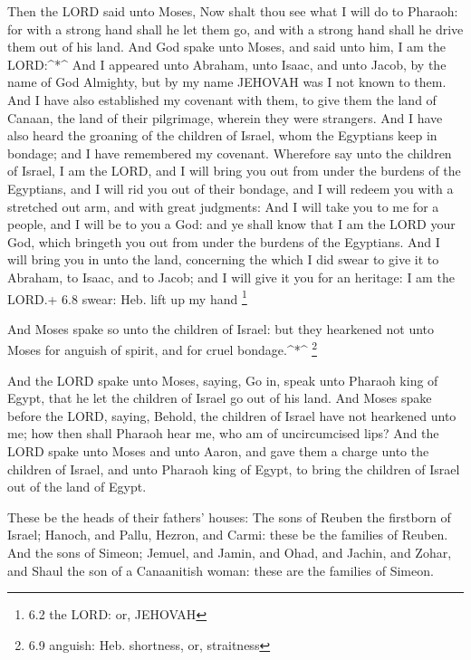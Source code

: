  Then the LORD said unto Moses, Now shalt thou see what I
will do to Pharaoh: for with a strong hand shall he let them go, and
with a strong hand shall he drive them out of his land.  And
God spake unto Moses, and said unto him, I am the LORD:\^{}*\^{}
 And I appeared unto Abraham, unto Isaac, and unto Jacob, by
the name of God Almighty, but by my name JEHOVAH was I not known to
them.  And I have also established my covenant with them, to
give them the land of Canaan, the land of their pilgrimage, wherein they
were strangers.  And I have also heard the groaning of the
children of Israel, whom the Egyptians keep in bondage; and I have
remembered my covenant.  Wherefore say unto the children of
Israel, I am the LORD, and I will bring you out from under the burdens
of the Egyptians, and I will rid you out of their bondage, and I will
redeem you with a stretched out arm, and with great judgments:
 And I will take you to me for a people, and I will be to
you a God: and ye shall know that I am the LORD your God, which bringeth
you out from under the burdens of the Egyptians.  And I will
bring you in unto the land, concerning the which I did swear to give it
to Abraham, to Isaac, and to Jacob; and I will give it you for an
heritage: I am the LORD.+ 6.8 swear: Heb. lift up my hand \footnote{6.2
  the LORD: or, JEHOVAH}

 And Moses spake so unto the children of Israel: but they
hearkened not unto Moses for anguish of spirit, and for cruel
bondage.\^{}*\^{} \footnote{6.9 anguish: Heb. shortness, or, straitness}

 And the LORD spake unto Moses, saying,  Go
in, speak unto Pharaoh king of Egypt, that he let the children of Israel
go out of his land.  And Moses spake before the LORD,
saying, Behold, the children of Israel have not hearkened unto me; how
then shall Pharaoh hear me, who am of uncircumcised lips? 
And the LORD spake unto Moses and unto Aaron, and gave them a charge
unto the children of Israel, and unto Pharaoh king of Egypt, to bring
the children of Israel out of the land of Egypt.

 These be the heads of their fathers' houses: The sons of
Reuben the firstborn of Israel; Hanoch, and Pallu, Hezron, and Carmi:
these be the families of Reuben.  And the sons of Simeon;
Jemuel, and Jamin, and Ohad, and Jachin, and Zohar, and Shaul the son of
a Canaanitish woman: these are the families of Simeon.

